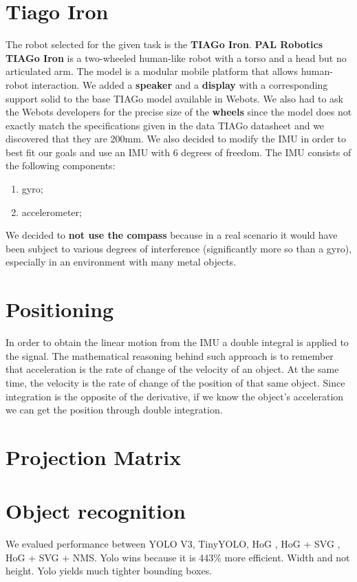 \documentclass[a4paper]{article}
\begin{document}
	\section{Tiago Iron} 
	The robot selected for the given task is the \textbf{TIAGo Iron}. \newline\textbf{PAL Robotics TIAGo Iron}\cite{tiagoiron} is a two-wheeled human-like robot with a torso and a head but no articulated arm. The model is a modular mobile platform that allows human-robot interaction.\newline
	We added a \textbf{speaker} and a \textbf{display} with a corresponding support solid to the base TIAGo model available in Webots.
	We also had to ask the Webots developers for the precise size of the \textbf{wheels} since the model does not exactly match the specifications given in the data TIAGo datasheet\cite{Tiago IRON datasheet} and we discovered that they are 200mm.
	\newline We also decided to modify the IMU in order to best fit our goals and use an IMU with 6 degrees of freedom.
	The IMU consists of the following components:
		\begin{enumerate}
			\item gyro;	
			\item accelerometer;
		\end{enumerate}
	We decided to \textbf{not use the compass} because in a real scenario it would have been subject to various degrees of interference (significantly more so than a gyro), especially in an environment with many metal objects.
	
	\section{Positioning}
	In order to obtain the linear motion from the IMU a double integral is applied to the signal. The mathematical reasoning behind such approach is to remember that acceleration is the rate of change of the velocity of an object. At the same time, the velocity is the rate of change of the position of that same object. Since integration is the opposite of the derivative, if we know the object's acceleration we can get the position through double integration.
	
	\section{Projection Matrix}
	\cite{OpenGL}
	
	\section{Object recognition}
	We evalued performance between YOLO V3, TinyYOLO, HoG , HoG + SVG  , HoG + SVG + NMS. Yolo wins because it is 443\% more efficient. Width and not height. Yolo yields much tighter bounding boxes. 
	
\end{document}
